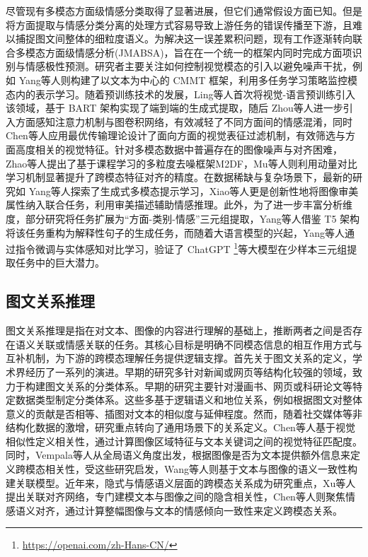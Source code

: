 尽管现有多模态方面级情感分类取得了显著进展，但它们通常假设方面已知。但是将方面提取与情感分类分离的处理方式容易导致上游任务的错误传播至下游，且难以捕捉图文间整体的细粒度语义。为解决这一误差累积问题，现有工作逐渐转向联合多模态方面级情感分析(JMABSA)，旨在在一个统一的框架内同时完成方面项识别与情感极性预测。研究者主要关注如何控制视觉模态的引入以避免噪声干扰，例如 Yang等人则构建了以文本为中心的 CMMT 框架，利用多任务学习策略监控模态内的表示学习\cite{yang2022cross}。随着预训练技术的发展，Ling等人首次将视觉-语言预训练引入该领域，基于 BART 架构实现了端到端的生成式提取\cite{ling2022vision}，随后 Zhou等人进一步引入方面感知注意力机制与图卷积网络，有效减轻了不同方面间的情感混淆\cite{zhou2023aomdetectingaspectorientedinformation}，同时Chen等人应用最优传输理论设计了面向方面的视觉表征过滤机制，有效筛选与方面高度相关的视觉特征\cite{chen2024aspects}。针对多模态数据中普遍存在的图像噪声与对齐困难，Zhao等人提出了基于课程学习的多粒度去噪框架M2DF\cite{zhao2023m2df}，Mu等人则利用动量对比学习机制显著提升了跨模态特征对齐的精度\cite{mu2023mocolnet}。在数据稀缺与复杂场景下，最新的研究如 Yang等人探索了生成式多模态提示学习\cite{yang2023few}，Xiao等人更是创新性地将图像审美属性纳入联合任务，利用审美描述辅助情感推理\cite{xiao2024atlantis}。此外，为了进一步丰富分析维度，部分研究将任务扩展为“方面-类别-情感”三元组提取，Yang等人借鉴 T5 架构将该任务重构为解释性句子的生成任务\cite{yang2023generating}，而随着大语言模型的兴起，Yang等人通过指令微调与实体感知对比学习，验证了 ChatGPT \footnote{\url{https://openai.com/zh-Hans-CN/}}等大模型在少样本三元组提取任务中的巨大潜力\cite{yang2024empirical}。



\subsection{图文关系推理}
图文关系推理是指在对文本、图像的内容进行理解的基础上，推断两者之间是否存在语义关联或情感关联的任务。其核心目标是明确不同模态信息的相互作用方式与互补机制，为下游的跨模态理解任务提供逻辑支撑。首先关于图文关系的定义，学术界经历了一系列的演进。早期的研究多针对新闻或网页等结构化较强的领域，致力于构建图文关系的分类体系。早期的研究主要针对漫画书、网页或科研论文等特定数据类型制定分类体系\cite{marsh2003taxonomy,lenth1990computer,martinec2005system}。这些多基于逻辑语义和地位关系，例如根据图文对整体意义的贡献是否相等、插图对文本的相似度与延伸程度。然而，随着社交媒体等非结构化数据的激增，研究重点转向了通用场景下的关系定义。Chen等人基于视觉相似性定义相关性，通过计算图像区域特征与文本关键词之间的视觉特征匹配度\cite{chen2013understanding}。同时，Vempala等人从全局语义角度出发，根据图像是否为文本提供额外信息来定义跨模态相关性\cite{vempala2019categorizing}，受这些研究启发，Wang等人则基于文本与图像的语义一致性构建关联模型\cite{wang2014bilateral}。近年来，隐式与情感语义层面的跨模态关系成为研究重点，Xu等人提出关联对齐网络，专门建模文本与图像之间的隐含相关性\cite{xu2022ananet}，Chen等人则聚焦情感语义对齐，通过计算整幅图像与文本的情感倾向一致性来定义跨模态关系\cite{chen2023joint}。

